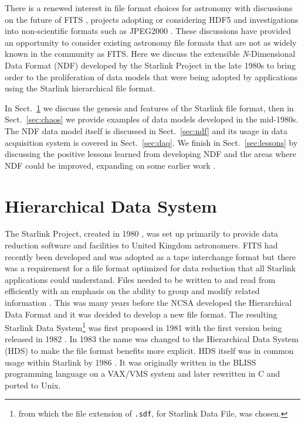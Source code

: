 \documentclass[final,authoryear,5p,times,twocolumn]{elsarticle}
\newcommand*\secref[1]{Sect.~\ref{#1}}
\begin{document}
There is a renewed interest in file format choices for astronomy
with discussions on the future of FITS
\citep{P90_adassxxiii,2014Thomas}, projects adopting or considering
HDF5 \citep{2012ASPC..461..283A,P10_adassxxiii} and investigations into
non-scientific formats such as JPEG2000 \citep{2014Kitaeff}. These
discussions have provided an opportunity to consider existing
astronomy file formats that are not as widely known in the community
as FITS. Here we discuss the extensible \emph{N}-Dimensional
Data Format (NDF) developed by the Starlink Project
\citep{1982MmSAI..53...55T,2000ASSL..250...93W} in the late 1980s
\citep{1988STARB...2...11C,SGP38} to bring order to the proliferation
of data models that were being adopted by applications using the Starlink
hierarchical file format.

In \secref{sec:hds} we discuss the genesis and features of the Starlink
file format, then in \secref{sec:chaos} we provide examples of data
models developed in the mid-1980s. The NDF data model itself is
discussed in \secref{sec:ndf} and its usage in data acquisition
system is covered in \secref{sec:daq}. We finish in 
\secref{sec:lessons} by discussing the positive lessons learned from
developing NDF and the areas where NDF could be improved, expanding on
some earlier work \citep{P91_adassxxiii}.

\section{Hierarchical Data System}
\label{sec:hds}

The Starlink Project, created in 1980
\citep{1980IrAJ...14..197E,1982MmSAI..53...55T}, was set up
primarily to provide data reduction software and facilities to United
Kingdom astronomers. FITS
\citep{1979ipia.coll..445W,1981A&AS...44..363W} had recently been
developed and was adopted as a tape interchange format but there was a
requirement for a file format optimized for data reduction that all
Starlink applications could understand. Files
needed to be written to and read from efficiently with an emphasis on the
ability to group and modify related information
\citep{1981STARENT4}. This was many years before the NCSA developed
the Hierarchical Data Format \citep{HDF1,Folk2010} and it was decided
to develop a new file format. The resulting Starlink Data
System\footnote{from which the file extension of \texttt{.sdf}, for
  Starlink Data File, was chosen.} was first proposed in 1981 with the
first version being released in 1982 \citep[see
e.g.][]{1982QJRAS..23..485D,1991STARB...8....2L}. In 1983 the name was
changed to the Hierarchical Data System (HDS) to make the file format
benefits more explicit. HDS itself was in common usage within Starlink by 1986
\citep{1986BICDS..30...13L}. It was originally written in the BLISS
programming language on a VAX/VMS system and later rewritten in C and
ported to Unix.
\end{document}
